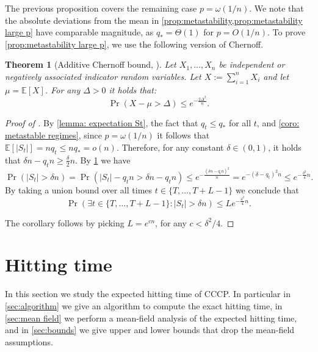 \documentclass[11pt,a4paper]{article}
\newtheorem{theorem}{Theorem}
\newcommand{\E}{\mathbb{E}}
\begin{document}
The previous proposition covers the remaining case $p=\omega(1/n)$.
We note that the absolute deviations from the mean in \cref{prop:metastability,prop:metastability large p} have comparable magnitude, as $q_* = \Theta(1)$ for $p=O(1/n)$.
To prove \cref{prop:metastability large p}, we use the following version of Chernoff.

\begin{theorem}[Additive Chernoff bound, \cite{dubhashi2009concentration}]\label{thm:chernoff bound additive}
Let $X_1,\dots,X_n$ be independent or negatively associated indicator random variables. 
Let $X := \sum_{i=1}^{n} X_i$ and let $\mu = \E[X]$.
For any $\Delta > 0$ it holds that:
\begin{equation*}
    \Pr( X - \mu > \Delta) \le e^{-\frac{2\Delta^2}{n}}.
\end{equation*}
\end{theorem}

\begin{proof}[Proof of ]
By \cref{lemma: expectation St}, the fact that $q_t \le q_*$ for all $t$, and \cref{coro: metastable regimes}, since $p = \omega(1/n)$ it follows that $\E[|S_t|] = nq_t \le nq_* = o(n)$.
Therefore, for any constant $\delta \in (0,1)$, it holds that $\delta n - q_t n \ge \frac{\delta}{2}n$.
By \cref{thm:chernoff bound additive} we have
\[
    \Pr\left( |S_t| > \delta n \right) 
    = \Pr\left( |S_t| - q_t n > \delta n - q_t n \right) 
    \le e^{-\frac{(\delta n - q_t n)^2}{n}}
    = e^{-(\delta - q_t)^2 n}
    \le e^{-\frac{\delta^2}{4}n}.
\]
By taking a union bound over all times $t \in \{T,\ldots,T+L-1\}$ we conclude that
\[
    \Pr\left(\exists t \in \{T,\ldots,T + L-1\} : |S_t| > \delta n \right) 
    \le L e^{-\frac{\delta^2}{4}n}.
\]

The corollary follows by picking $L = e^{cn}$, for any $c < \delta^2/4$.
\end{proof}

\section{Hitting time}\label{sec:hitting time}
In this section we study the expected hitting time of CCCP.
In particular in \cref{sec:algorithm} we give an algorithm to compute the exact hitting time, in \cref{sec:mean field} we perform a mean-field analysis of the expected hitting time, and in \cref{sec:bounds} we give upper and lower bounds that drop the mean-field assumptions.
\end{document}
